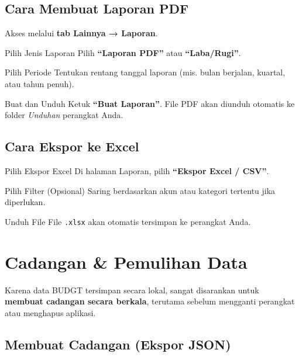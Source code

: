 \documentclass[12pt, a4paper]{article}
\begin{document}
\subsection{Cara Membuat Laporan PDF}

Akses melalui \textbf{tab Lainnya → Laporan}.

\begin{stepbox}{Pilih Jenis Laporan}
  Pilih \textbf{``Laporan PDF''} atau \textbf{``Laba/Rugi''}.
\end{stepbox}

\begin{stepbox}{Pilih Periode}
  Tentukan rentang tanggal laporan (mis. bulan berjalan, kuartal, atau tahun penuh).
\end{stepbox}

\begin{stepbox}{Buat dan Unduh}
  Ketuk \textbf{``Buat Laporan''}. File PDF akan diunduh otomatis ke folder \textit{Unduhan} perangkat Anda.
\end{stepbox}

\subsection{Cara Ekspor ke Excel}

\begin{stepbox}{Pilih Ekspor Excel}
  Di halaman Laporan, pilih \textbf{``Ekspor Excel / CSV''}.
\end{stepbox}

\begin{stepbox}{Pilih Filter (Opsional)}
  Saring berdasarkan akun atau kategori tertentu jika diperlukan.
\end{stepbox}

\begin{stepbox}{Unduh File}
  File \texttt{.xlsx} akan otomatis tersimpan ke perangkat Anda.
\end{stepbox}

\section{Cadangan \& Pemulihan Data}

Karena data BUDGT tersimpan secara lokal, sangat disarankan untuk \textbf{membuat cadangan secara berkala}, terutama sebelum mengganti perangkat atau menghapus aplikasi.

\subsection{Membuat Cadangan (Ekspor JSON)}
\end{document}
